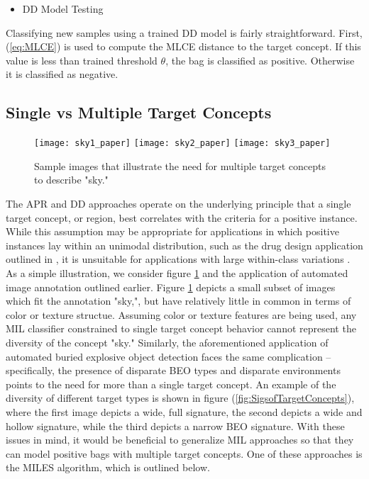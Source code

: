 \documentclass[12pt,dvips]{report}
\numberwithin{equation}{section}
\begin{document}
\begin{itemize}[leftmargin=12 pt]
\item DD Model Testing
\end{itemize}

Classifying new samples using a trained DD model is fairly straightforward.  First, (\ref{eq:MLCE}) is used to compute the MLCE distance to the target concept.  If this value is less than trained threshold $\theta$, the bag is classified as positive.  Otherwise it is classified as negative.


\subsection{Single vs Multiple Target Concepts}

\begin{figure}[htb]
  \centerline{\texttt{[image: sky1\_paper]} \texttt{[image: sky2\_paper]} \texttt{[image: sky3\_paper]}}
\caption{Sample images that illustrate the need for multiple target concepts to describe "sky."}
\label{fig:DiverseSky}
\end{figure}


The APR and DD approaches operate on the underlying principle that a single target concept, or region, best correlates with the criteria for a positive instance. While this assumption may be appropriate for applications in which positive instances lay within an unimodal distribution, such as the drug design application outlined in \cite{diet97}, it is unsuitable for applications with large within-class variations \cite{chen06_miles}. As a simple illustration, we consider figure \ref{fig:DiverseSky} and the application of automated image annotation outlined earlier.  Figure \ref{fig:DiverseSky} depicts a small subset of images which fit the annotation "sky,", but have relatively little in common in terms of color or texture structue.  Assuming color or texture features are being used, any MIL classifier constrained to single target concept behavior cannot represent the diversity of the concept "sky."  Similarly, the aforementioned application of automated buried explosive object detection faces the same complication -- specifically, the presence of disparate BEO types and disparate environments \cite{friguipaul2009} points to the need for more than a single target concept.  An example of the diversity of different target types is shown in figure (\ref{fig:SigsofTargetConcepts}), where the first image depicts a wide, full signature, the second depicts a wide and hollow signature, while the third depicts a narrow BEO signature.  With these issues in mind, it would be beneficial to generalize MIL approaches so that they can model positive bags with multiple target concepts. One of these approaches is the MILES algorithm, which is outlined below.
\end{document}
